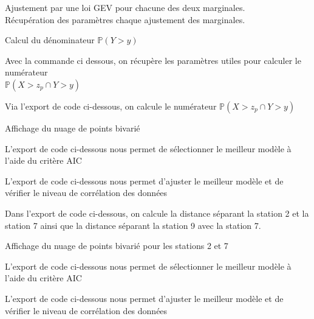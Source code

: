 \documentclass[a4paper,french,10pt]{article}
\begin{document}
\newpage

Ajustement par une loi GEV pour chacune des deux marginales. \\
Récupération des paramètres chaque ajustement des marginales.



Calcul du dénominateur $\mathbb{P}(Y > y)$


Avec la commande ci dessous, on récupère les paramètres utiles pour calculer le numérateur \\ 
$\mathbb{P}(X > z_p \cap Y > y)$ 


Via l'export de code ci-dessous, on calcule le numérateur $\mathbb{P}(X > z_p \cap Y > y)$


Affichage du nuage de points bivarié


L'export de code ci-dessous nous permet de sélectionner le meilleur modèle à l'aide du critère AIC


L'export de code ci-dessous nous permet d'ajuster le meilleur modèle et de vérifier le niveau de corrélation des données


Dans l'export de code ci-dessous, on calcule la distance séparant la station 2 et la station 7 ainsi que la distance séparant la station 9 avec la station 7.


Affichage du nuage de points bivarié pour les stations 2 et 7


L'export de code ci-dessous nous permet de sélectionner le meilleur modèle à l'aide du critère AIC


L'export de code ci-dessous nous permet d'ajuster le meilleur modèle et de vérifier le niveau de corrélation des données

\end{document}
